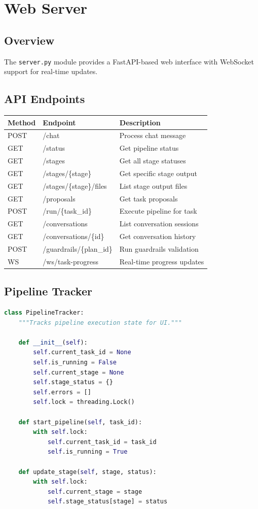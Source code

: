 \documentclass[12pt,a4paper]{report}
\begin{document}
\chapter{Web Server}

\section{Overview}
The \texttt{server.py} module provides a FastAPI-based web interface with WebSocket support for real-time updates.

\section{API Endpoints}
\begin{longtable}{|l|l|p{6cm}|}
\hline
\textbf{Method} & \textbf{Endpoint} & \textbf{Description} \\
\hline
POST & /chat & Process chat message \\
\hline
GET & /status & Get pipeline status \\
\hline
GET & /stages & Get all stage statuses \\
\hline
GET & /stages/\{stage\} & Get specific stage output \\
\hline
GET & /stages/\{stage\}/files & List stage output files \\
\hline
GET & /proposals & Get task proposals \\
\hline
POST & /run/\{task\_id\} & Execute pipeline for task \\
\hline
GET & /conversations & List conversation sessions \\
\hline
GET & /conversations/\{id\} & Get conversation history \\
\hline
POST & /guardrails/\{plan\_id\} & Run guardrails validation \\
\hline
WS & /ws/task-progress & Real-time progress updates \\
\hline
\end{longtable}

\section{Pipeline Tracker}
\begin{lstlisting}[language=Python]
class PipelineTracker:
    """Tracks pipeline execution state for UI."""
    
    def __init__(self):
        self.current_task_id = None
        self.is_running = False
        self.current_stage = None
        self.stage_status = {}
        self.errors = []
        self.lock = threading.Lock()
    
    def start_pipeline(self, task_id):
        with self.lock:
            self.current_task_id = task_id
            self.is_running = True
    
    def update_stage(self, stage, status):
        with self.lock:
            self.current_stage = stage
            self.stage_status[stage] = status
\end{lstlisting}
\end{document}
